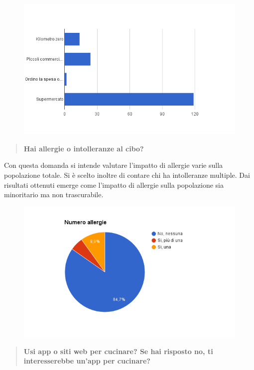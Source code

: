\begin{figure}[H]
	\centering
	\includegraphics[scale=0.6]{img/chart_dove_fai_la_spesa}
\end{figure}

\begin{quote}
	\textbf{Hai allergie o intolleranze al cibo?}
\end{quote}

Con questa domanda si intende valutare l'impatto di allergie varie sulla popolazione totale. Si è scelto inoltre di contare chi ha intolleranze multiple.
Dai risultati ottenuti emerge come l'impatto di allergie sulla popolazione sia minoritario ma non trascurabile.

\begin{figure}[H]
	\centering
	\includegraphics[scale=0.6]{img/chart_allergie}
\end{figure}

\begin{quote}
	\textbf{Usi app o siti web per cucinare? Se hai risposto no, ti interesserebbe un'app per cucinare?}
\end{quote}

